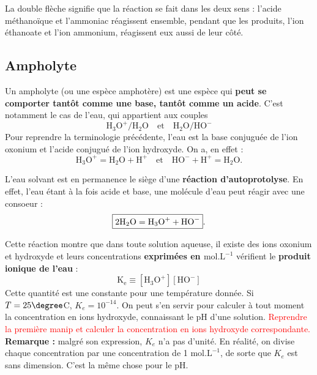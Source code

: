 \documentclass[11pt,a4paper]{report}
\begin{document}
La double flèche signifie que la réaction se fait dans les deux sens : l'acide méthanoïque et l'ammoniac réagissent ensemble, pendant que les produits, l'ion éthanoate et l'ion ammonium, réagissent eux aussi de leur côté.

\subsection{Ampholyte}

Un ampholyte (ou une espèce amphotère) est une espèce qui \textbf{peut se comporter tantôt comme une base, tantôt comme un acide}. C'est notamment le cas de l'eau, qui appartient aux couples
\begin{equation}
	\text{H}_3\text{O}^+ / \text{H}_2\text{O}     \quad\text{et}\quad   
	\text{H}_2\text{O} / \text{HO}^-
\end{equation}
Pour reprendre la terminologie précédente, l'eau est la base conjuguée de l'ion oxonium et l'acide conjugué de l'ion hydroxyde. On a, en effet :
\begin{equation}
	\text{H}_3\text{O}^+ = \text{H}_2\text{O} + \text{H}^+ \quad\text{et}\quad 
	\text{HO}^- + \text{H}^+ = \text{H}_2\text{O}.
\end{equation}

L'eau solvant est en permanence le siège d'une \textbf{réaction d'autoprotolyse}. En effet, l'eau étant à la fois acide et base, une molécule d'eau peut réagir avec une consoeur :
\begin{equation}
	\boxed{2 \text{H}_2\text{O} = \text{H}_3\text{O}^+ + \text{HO}^-}.\\
\end{equation}

Cette réaction montre que dans toute solution aqueuse, il existe des ions oxonium et hydroxyde et leurs concentrations \textbf{exprimées en $\text{mol}.\text{L}^{-1}$} vérifient le \textbf{produit ionique de l'eau} :
\begin{equation}
	\text{K}_\text{e} \equiv [\text{H}_3\text{O}^+] [\text{HO}^-]
\end{equation}
Cette quantité est une constante pour une température donnée. Si $T = 25\degree$C, $K_e = 10^{-14}$. On peut s'en servir pour calculer à tout moment la concentration en ions hydroxyde, connaissant le pH d'une solution. \textcolor{red}{Reprendre la première manip et calculer la concentration en ions hydroxyde correspondante.}\\

\textbf{Remarque :} malgré son expression, $K_e$ n'a pas d'unité. En réalité, on divise chaque concentration par une concentration de 1 $\text{mol}.\text{L}^{-1}$, de sorte que $K_e$ est sans dimension. C'est la même chose pour le pH.\\
\end{document}
